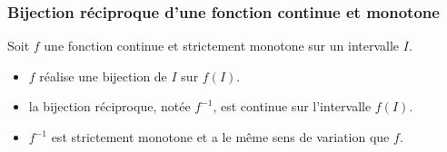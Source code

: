 \subsubsection{Bijection réciproque d'une fonction continue et monotone}
\begin{propriete}
	Soit $f$ une fonction continue et strictement monotone sur un intervalle $I$.
	\begin{itemize}
		\item $f$ réalise une bijection de $I$ sur $f(I)$.
		\item la bijection réciproque, notée $f^{-1}$, est continue sur l'intervalle $f(I)$.
		\item $f^{-1}$ est strictement monotone et a le même sens de variation que $f$.
	\end{itemize}
\end{propriete}

